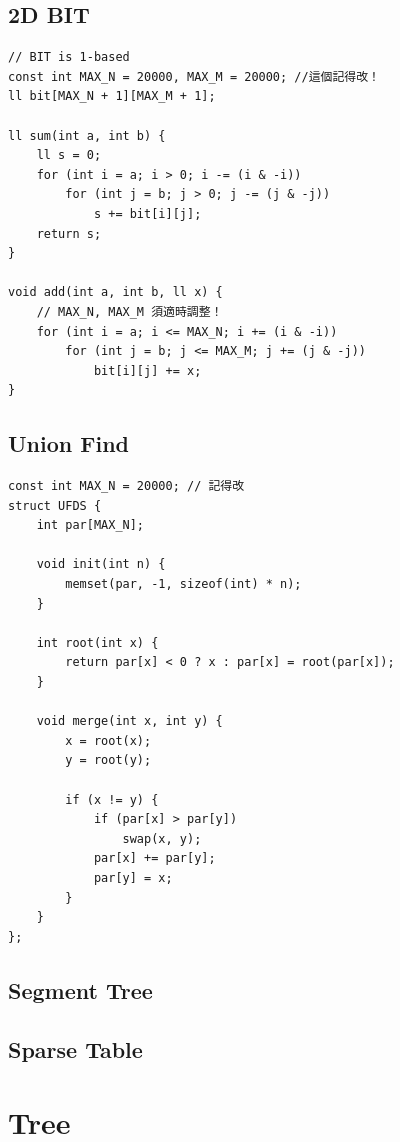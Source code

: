 \documentclass[10pt,oneside]{article}
\begin{document}
\begin{landscape}
\begin{multicols}{2}
\subsection{2D BIT}

\begin{verbatim}
// BIT is 1-based
const int MAX_N = 20000, MAX_M = 20000; //這個記得改！
ll bit[MAX_N + 1][MAX_M + 1];

ll sum(int a, int b) {
    ll s = 0;
    for (int i = a; i > 0; i -= (i & -i))
        for (int j = b; j > 0; j -= (j & -j))
            s += bit[i][j];
    return s;
}

void add(int a, int b, ll x) {
    // MAX_N, MAX_M 須適時調整！
    for (int i = a; i <= MAX_N; i += (i & -i))
        for (int j = b; j <= MAX_M; j += (j & -j))
            bit[i][j] += x;
}
\end{verbatim}

\subsection{Union Find}

\begin{verbatim}
const int MAX_N = 20000; // 記得改
struct UFDS {
    int par[MAX_N];

    void init(int n) {
        memset(par, -1, sizeof(int) * n);
    }

    int root(int x) {
        return par[x] < 0 ? x : par[x] = root(par[x]);
    }

    void merge(int x, int y) {
        x = root(x);
        y = root(y);

        if (x != y) {
            if (par[x] > par[y])
                swap(x, y);
            par[x] += par[y];
            par[y] = x;
        }
    }
};
\end{verbatim}

\subsection{Segment Tree}

\subsection{Sparse Table}


\section{Tree}


\end{multicols}
\end{landscape}
\end{document}
